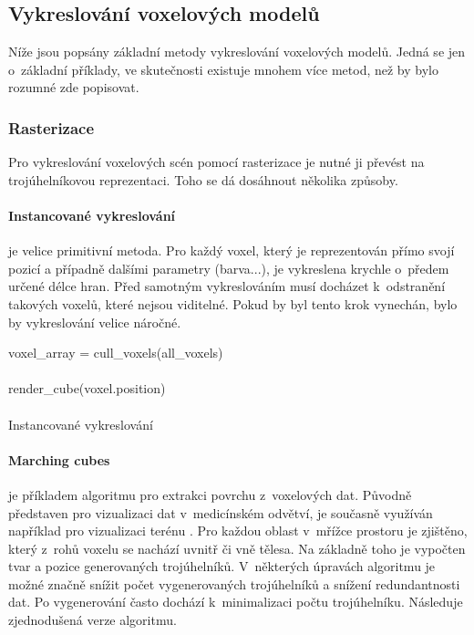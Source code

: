 \subsection{Vykreslování voxelových modelů}
Níže jsou popsány základní metody vykreslování voxelových modelů. Jedná se jen o~základní příklady, ve skutečnosti existuje mnohem více metod, než by bylo rozumné zde popisovat.

\subsubsection{Rasterizace}
Pro vykreslování voxelových scén pomocí rasterizace je nutné ji převést na trojúhelníkovou reprezentaci. Toho se dá dosáhnout několika způsoby.

\paragraph{Instancované vykreslování} je velice primitivní metoda. Pro každý voxel, který je reprezentován přímo svojí pozicí a případně dalšími parametry (barva...), je vykreslena krychle o~předem určené délce hran. Před samotným vykreslováním musí docházet k~odstranění takových voxelů, které nejsou viditelné. Pokud by byl tento krok vynechán, bylo by vykreslování velice náročné. \cite{nousiainen_2019}

\begin{center}
	\begin{czechalgorithm}[H] \label{alg:instanced_cube}
		voxel\_array = cull\_voxels(all\_voxels)\\
		 {\\
			render\_cube(voxel.position)\\
		}\\
		\caption{Instancované vykreslování}
	\end{czechalgorithm}
\end{center}

\paragraph{Marching cubes \cite{marching_cubes}} je příkladem algoritmu pro extrakci povrchu z~voxelových dat. Původně představen pro vizualizaci dat v~medicínském odvětví, je současně využíván například pro vizualizaci terénu \cite{nguyen_2008}. Pro každou oblast v~mřížce prostoru je zjištěno, který z~rohů voxelu se nachází uvnitř či vně tělesa. Na základně toho je vypočten tvar a pozice generovaných trojúhelníků. V~některých úpravách algoritmu je možné značně snížit počet vygenerovaných trojúhelníků a snížení redundantnosti dat. Po vygenerování často dochází k~minimalizaci počtu trojúhelníku. Následuje zjednodušená verze algoritmu.

